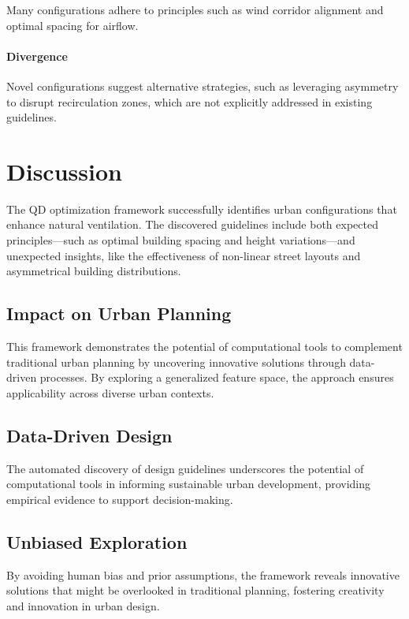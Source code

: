 \documentclass[times,final]{elsarticle}
\begin{document}
Many configurations adhere to principles such as wind corridor alignment
and optimal spacing for airflow.


\paragraph{Divergence}

Novel configurations suggest alternative strategies, such as leveraging
asymmetry to disrupt recirculation zones, which are not explicitly
addressed in existing guidelines.


\section{Discussion}

The QD optimization framework successfully identifies urban
configurations that enhance natural ventilation. The discovered
guidelines include both expected principles---such as optimal building
spacing and height variations---and unexpected insights, like the
effectiveness of non-linear street layouts and asymmetrical building
distributions.

\subsection{Impact on Urban Planning}

This framework demonstrates the potential of computational tools to
complement traditional urban planning by uncovering innovative solutions
through data-driven processes. By exploring a generalized feature space,
the approach ensures applicability across diverse urban contexts.


\subsection{Data-Driven Design}

The automated discovery of design guidelines underscores the potential
of computational tools in informing sustainable urban development,
providing empirical evidence to support decision-making.


\subsection{Unbiased Exploration}

By avoiding human bias and prior assumptions, the framework reveals
innovative solutions that might be overlooked in traditional planning,
fostering creativity and innovation in urban design.
\end{document}
